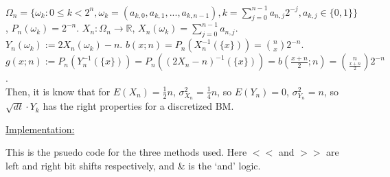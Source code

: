 \documentclass[12pt]{article}
\newcommand{\reals}[0] { \mathbb{R}}
\begin{document}
\begin{flushleft}
$\Omega_n = \{ \omega_k: 0 \le k < 2^n, \omega_k = (a_{k,0}, a_{k,1}, ... ,a_{k,n-1}), k = \sum_{j=0}^{n-1} a_{n,j} 2^{-j}, a_{k,j} \in \{ 0,1 \} \}$, $P_n(\omega_k) = 2^{-n}$. $X_n: \Omega_n \rightarrow \reals$, $X_n(\omega_k) = \sum_{j=0}^{n-1} a_{n,j} $. $Y_n(\omega_k) := 2 X_n(\omega_k) - n$. $b(x; n) = P_n ( X_n^{-1}( \{ x \}) ) = \binom{n}{x} 2^{-n} $. $g(x; n) := P_n ( Y_n^{-1}( \{ x \}) ) = P_n ( (2 X_n - n)^{-1}( \{ x \}) ) =  b(\frac{x+n}{2}; n) = \binom{n}{\frac{x+n}{2}} 2^{-n} $. \\ 
Then, it is know that for $E(X_n) = \frac{1}{2} n $, $\sigma_{X_n}^2 = \frac{1}{4} n$, so $E(Y_n) = 0$, $\sigma_{Y_n}^2 = n$, so $\sqrt{dt} \cdot Y_k$ has the right properties for a discretized BM.
\end{flushleft}

\begin{flushleft}
\underline{Implementation:}
\end{flushleft}

\begin{flushleft}
This is the psuedo code for the three methods used. Here $<<$ and $>>$ are left and right bit shifts respectively, and \& is the `and' logic.
\end{flushleft}
\end{document}
